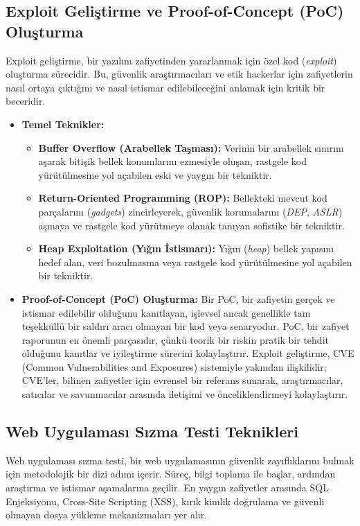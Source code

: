 \subsection{Exploit Geliştirme ve Proof-of-Concept (PoC) Oluşturma}

Exploit geliştirme, bir yazılım zafiyetinden yararlanmak için özel kod (\textit{exploit}) oluşturma sürecidir. Bu, güvenlik araştırmacıları ve etik hackerlar için zafiyetlerin nasıl ortaya çıktığını ve nasıl istismar edilebileceğini anlamak için kritik bir beceridir.

\begin{itemize}
\item \textbf{Temel Teknikler:}
\begin{itemize}
\item \textbf{Buffer Overflow (Arabellek Taşması):} Verinin bir arabellek sınırını aşarak bitişik bellek konumlarını ezmesiyle oluşan, rastgele kod yürütülmesine yol açabilen eski ve yaygın bir tekniktir.
\item \textbf{Return-Oriented Programming (ROP):} Bellekteki mevcut kod parçalarını (\textit{gadgets}) zincirleyerek, güvenlik korumalarını (\textit{DEP}, \textit{ASLR}) aşmaya ve rastgele kod yürütmeye olanak tanıyan sofistike bir tekniktir.
\item \textbf{Heap Exploitation (Yığın İstismarı):} Yığın (\textit{heap}) bellek yapısını hedef alan, veri bozulmasına veya rastgele kod yürütülmesine yol açabilen bir tekniktir.
\end{itemize}
\item \textbf{Proof-of-Concept (PoC) Oluşturma:} Bir PoC, bir zafiyetin gerçek ve istismar edilebilir olduğunu kanıtlayan, işlevsel ancak genellikle tam teşekküllü bir saldırı aracı olmayan bir kod veya senaryodur. PoC, bir zafiyet raporunun en önemli parçasıdır, çünkü teorik bir riskin pratik bir tehdit olduğunu kanıtlar ve iyileştirme sürecini kolaylaştırır. Exploit geliştirme, CVE (Common Vulnerabilities and Exposures) sistemiyle yakından ilişkilidir; CVE'ler, bilinen zafiyetler için evrensel bir referans sunarak, araştırmacılar, satıcılar ve savunmacılar arasında iletişimi ve önceliklendirmeyi kolaylaştırır.
\end{itemize}

\subsection{Web Uygulaması Sızma Testi Teknikleri}

Web uygulaması sızma testi, bir web uygulamasının güvenlik zayıflıklarını bulmak için metodolojik bir dizi adımı içerir. Süreç, bilgi toplama ile başlar, ardından araştırma ve istismar aşamalarına geçilir. En yaygın zafiyetler arasında SQL Enjeksiyonu, Cross-Site Scripting (XSS), kırık kimlik doğrulama ve güvenli olmayan dosya yükleme mekanizmaları yer alır.

